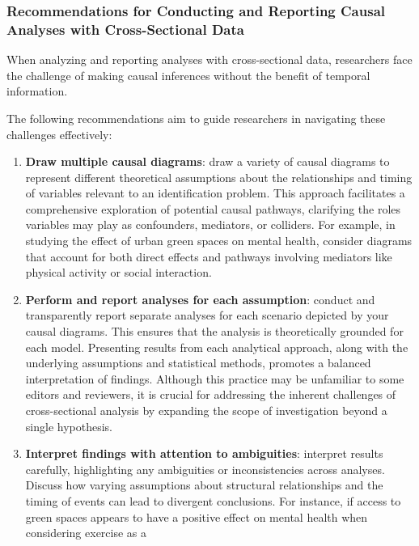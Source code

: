 \documentclass[
  singlecolumn]{article}
\begin{document}
\subsubsection{Recommendations for Conducting and Reporting Causal
Analyses with Cross-Sectional
Data}\label{recommendations-for-conducting-and-reporting-causal-analyses-with-cross-sectional-data}

When analyzing and reporting analyses with cross-sectional data,
researchers face the challenge of making causal inferences without the
benefit of temporal information.

The following recommendations aim to guide researchers in navigating
these challenges effectively:

\begin{enumerate}
\def\labelenumi{\arabic{enumi}.}
\item
  \textbf{Draw multiple causal diagrams}: draw a variety of causal
  diagrams to represent different theoretical assumptions about the
  relationships and timing of variables relevant to an identification
  problem. This approach facilitates a comprehensive exploration of
  potential causal pathways, clarifying the roles variables may play as
  confounders, mediators, or colliders. For example, in studying the
  effect of urban green spaces on mental health, consider diagrams that
  account for both direct effects and pathways involving mediators like
  physical activity or social interaction.
\item
  \textbf{Perform and report analyses for each assumption}: conduct and
  transparently report separate analyses for each scenario depicted by
  your causal diagrams. This ensures that the analysis is theoretically
  grounded for each model. Presenting results from each analytical
  approach, along with the underlying assumptions and statistical
  methods, promotes a balanced interpretation of findings. Although this
  practice may be unfamiliar to some editors and reviewers, it is
  crucial for addressing the inherent challenges of cross-sectional
  analysis by expanding the scope of investigation beyond a single
  hypothesis.
\item
  \textbf{Interpret findings with attention to ambiguities}: interpret
  results carefully, highlighting any ambiguities or inconsistencies
  across analyses. Discuss how varying assumptions about structural
  relationships and the timing of events can lead to divergent
  conclusions. For instance, if access to green spaces appears to have a
  positive effect on mental health when considering exercise as a

\end{enumerate}
\end{document}
